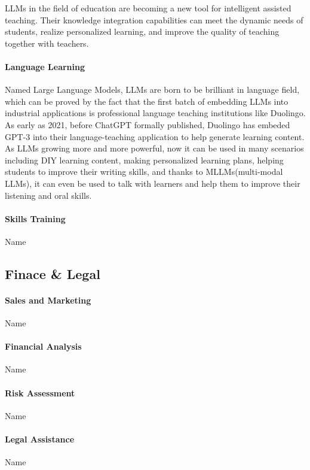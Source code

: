 \documentclass[fleqn,10pt]{SelfArx} %
\begin{document}
LLMs in the field of education are becoming a new tool for intelligent assisted teaching. Their knowledge integration capabilities can meet the dynamic needs of students, realize personalized learning, and improve the quality of teaching together with teachers.

\paragraph{Language Learning} Named Large Language Models, LLMs are born to be brilliant in language field, which can be proved by the fact that the first batch of embedding LLMs into industrial applications is professional language teaching institutions like Duolingo. As early as 2021, before ChatGPT formally published, Duolingo has embeded GPT-3 into their language-teaching application to help generate learning content. As LLMs growing more and more powerful, now it can be used in many scenarios including DIY learning content, making personalized learning plans, helping students to improve their writing skills, and thanks to MLLMs(multi-modal LLMs), it can even be used to talk with learners and help them to improve their listening and oral skills.
\paragraph{Skills Training} Name %

\subsection{Finace \& Legal}

\paragraph{Sales and Marketing} Name %
\paragraph{Financial Analysis} Name %

\paragraph{Risk Assessment} Name %

\paragraph{Legal Assistance} Name %
\end{document}
